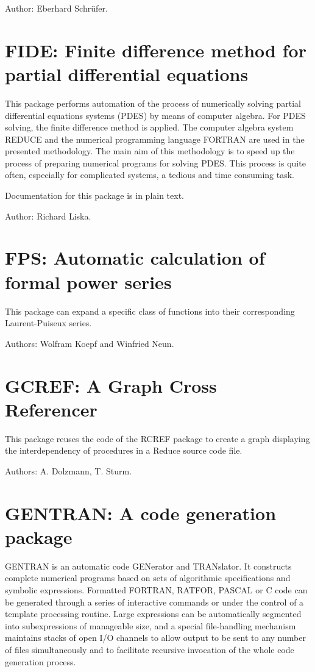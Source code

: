 Author: Eberhard Schr\"ufer.

\section{FIDE: Finite difference method for partial differential equations}

This package performs  automation of  the process of numerically
solving  partial  differential  equations  systems  (PDES)  by  means of
computer algebra.  For PDES solving, the finite difference method is applied.
The  computer  algebra  system  REDUCE  and  the  numerical  programming
language FORTRAN  are used in the presented methodology. The main aim of
this methodology is to speed up the process of preparing numerical
programs for  solving PDES.  This process is quite often, especially for
complicated systems, a tedious and time consuming task.

Documentation for this package is in plain text.

Author: Richard Liska.

\section{FPS: Automatic calculation of formal power series} 

This package can expand a specific class of functions into their
corresponding Laurent-Puiseux series.

Authors: Wolfram Koepf and Winfried Neun.

\section{GCREF: A Graph Cross Referencer}
\label{GCREF}

This package reuses the code of the RCREF package to create a graph displaying
the interdependency of procedures in a Reduce source code file. 

Authors: A. Dolzmann, T. Sturm.


\section{GENTRAN: A code generation package} 
\label{GENTRAN}

GENTRAN is an automatic code GENerator and TRANslator. It constructs
complete numerical programs based on sets of algorithmic specifications
and symbolic expressions. Formatted FORTRAN, RATFOR, PASCAL or C code can be
generated through a series of interactive commands or under the control of
a template processing routine. Large expressions can be automatically
segmented into subexpressions of manageable size, and a special
file-handling mechanism maintains stacks of open I/O channels to allow
output to be sent to any number of files simultaneously and to facilitate
recursive invocation of the whole code generation process.

